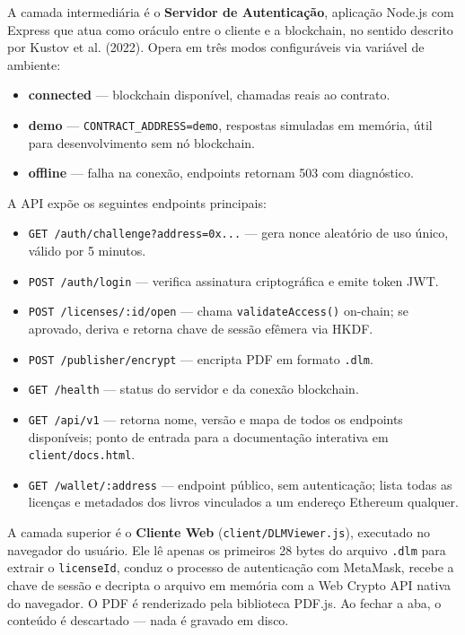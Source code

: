 \documentclass[12pt]{article}
\begin{document}
A camada intermediária é o \textbf{Servidor de Autenticação}, aplicação Node.js com Express que atua como oráculo entre o cliente e a blockchain, no sentido descrito por Kustov et al. (2022). Opera em três modos configuráveis via variável de ambiente:

\begin{itemize}
    \item \textbf{connected} — blockchain disponível, chamadas reais ao contrato.
    \item \textbf{demo} — \texttt{CONTRACT\_ADDRESS=demo}, respostas simuladas em memória, útil para desenvolvimento sem nó blockchain.
    \item \textbf{offline} — falha na conexão, endpoints retornam 503 com diagnóstico.
\end{itemize}

A API expõe os seguintes endpoints principais:

\begin{itemize}
    \item \texttt{GET /auth/challenge?address=0x...} — gera nonce aleatório de uso único, válido por 5 minutos.
    \item \texttt{POST /auth/login} — verifica assinatura criptográfica e emite token JWT.
    \item \texttt{POST /licenses/:id/open} — chama \texttt{validateAccess()} on-chain; se aprovado, deriva e retorna chave de sessão efêmera via HKDF.
    \item \texttt{POST /publisher/encrypt} — encripta PDF em formato \texttt{.dlm}.
    \item \texttt{GET /health} — status do servidor e da conexão blockchain.
    \item \texttt{GET /api/v1} — retorna nome, versão e mapa de todos os endpoints disponíveis; ponto de entrada para a documentação interativa em \texttt{client/docs.html}.
    \item \texttt{GET /wallet/:address} — endpoint público, sem autenticação; lista todas as licenças e metadados dos livros vinculados a um endereço Ethereum qualquer.
\end{itemize}

A camada superior é o \textbf{Cliente Web} (\texttt{client/DLMViewer.js}), executado no navegador do usuário. Ele lê apenas os primeiros 28 bytes do arquivo \texttt{.dlm} para extrair o \texttt{licenseId}, conduz o processo de autenticação com MetaMask, recebe a chave de sessão e decripta o arquivo em memória com a Web Crypto API nativa do navegador. O PDF é renderizado pela biblioteca PDF.js. Ao fechar a aba, o conteúdo é descartado — nada é gravado em disco.
\end{document}
